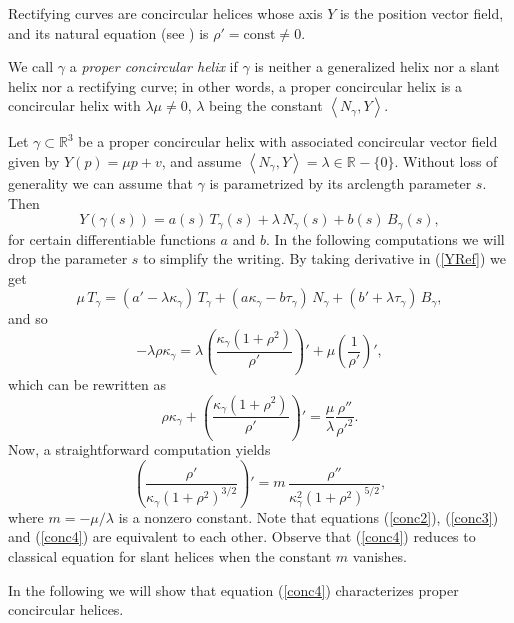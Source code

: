 \documentclass[eqnumis, pdf]{hjms}
\def\R#1{\ensuremath{\mathbb{R}^{#1}}}
\def\<{\left<}
\def\>{\right>}
\begin{document}
\begin{example}
Rectifying curves are concircular helices whose axis $Y$ is the position vector field, and its natural equation (see \cite{Chen03}) is
$\rho'=\text{const}\neq0$.
\end{example}

We call $\gamma$ a \emph{proper concircular helix} if $\gamma$ is neither a generalized helix nor a slant helix nor a rectifying curve; in other words, a proper concircular helix is a concircular helix with $\lambda\mu\neq0$, $\lambda$ being the constant $\<N_\gamma,Y\>$.

Let $\gamma\subset\R3$ be a proper concircular helix with associated concircular vector field given by $Y(p)=\mu p+v$, and assume $\<N_\gamma,Y\>=\lambda\in\R{}-\{0\}$. Without loss of generality we can assume that $\gamma$ is parametrized by its arclength parameter $s$. Then
\begin{equation}\label{YRef}
Y(\gamma(s))=a(s)\,T_\gamma(s)+\lambda\,N_\gamma(s)+b(s)\,B_\gamma(s),
\end{equation}
for certain differentiable functions $a$ and $b$. In the following computations we will drop the parameter $s$ to simplify the writing. By taking derivative in (\ref{YRef}) we get
\[
\mu\,T_\gamma=(a'-\lambda\kappa_\gamma)\,T_\gamma+ (a\kappa_\gamma-b\tau_\gamma)\,N_\gamma+ (b'+\lambda\tau_\gamma)\,B_\gamma,
\]
and so
\begin{equation}\label{conc2}
-\lambda\rho\kappa_\gamma=\lambda\left(\frac{\kappa_\gamma(1+\rho^2)}{\rho'}\right)'+ \mu\left(\frac{1}{\rho'}\right)',
\end{equation}
which can be rewritten as
\begin{equation}\label{conc3}
\rho\kappa_\gamma+\left(\frac{\kappa_\gamma(1+\rho^2)}{\rho'}\right)'= \frac{\mu}{\lambda}\frac{\rho''}{\rho'^2}.
\end{equation}
Now, a straightforward computation yields
\begin{equation}\label{conc4}
\left(\frac{\rho'}{\kappa_\gamma(1+\rho^2)^{3/2}}\right)'= m\,\frac{\rho''}{\kappa_\gamma^2(1+\rho^2)^{5/2}},
\end{equation}
where $m=-\mu/\lambda$ is a nonzero constant. Note that equations (\ref{conc2}), (\ref{conc3}) and (\ref{conc4}) are equivalent to each other. Observe that (\ref{conc4}) reduces to classical equation for slant helices when the constant $m$ vanishes.

In the following we will show that equation (\ref{conc4}) characterizes proper concircular helices.
\end{document}
